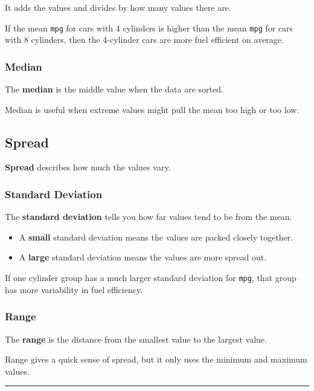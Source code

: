 \documentclass[
]{article}
\begin{document}
It adds the values and divides by how many values there are.

If the mean \texttt{mpg} for cars with 4 cylinders is higher than the
mean \texttt{mpg} for cars with 8 cylinders, then the 4-cylinder cars
are more fuel efficient on average.

\subsubsection{Median}\label{median}

The \textbf{median} is the middle value when the data are sorted.

Median is useful when extreme values might pull the mean too high or too
low.

\subsection{Spread}\label{spread}

\textbf{Spread} describes how much the values vary.

\subsubsection{Standard Deviation}\label{standard-deviation}

The \textbf{standard deviation} tells you how far values tend to be from
the mean.

\begin{itemize}
\item
  A \textbf{small} standard deviation means the values are packed
  closely together.
\item
  A \textbf{large} standard deviation means the values are more spread
  out.
\end{itemize}

If one cylinder group has a much larger standard deviation for
\texttt{mpg}, that group has more variability in fuel efficiency.

\subsubsection{Range}\label{range}

The \textbf{range} is the distance from the smallest value to the
largest value.

Range gives a quick sense of spread, but it only uses the minimum and
maximum values.

\begin{center}\rule{0.5\linewidth}{0.5pt}\end{center}
\end{document}
